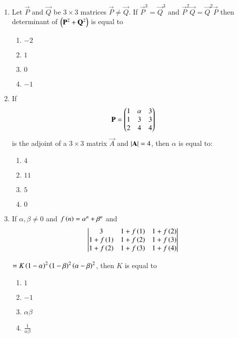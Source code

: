 \documentclass[journal,onecolumn]{IEEEtran}
\theoremstyle{remark}
\begin{document}
\begin{enumerate}
	\item Let $\vec{P}$ and $\vec{Q}$ be $3\times3$ matrices $\vec{P}\neq \vec{Q}$. If $\vec{P}^3=\vec{Q}^3$ and $\vec{P}^2\vec{Q}=\vec{Q}^2\vec{P}$ then determinant of $\left(\mathbf{P}^2+\mathbf{Q}^2\right)$ is equal to
	\hfill{}
        \begin{enumerate}
                \item $-2$
                \item $1$
                \item $0$
                \item $-1$
        \end{enumerate}

	\item If \begin{align*}
		\mathbf{P} = \begin{pmatrix}1&\alpha&3\\
		1&3&3\\
		2&4&4\end{pmatrix}
	\end{align*} is the adjoint of a $3\times3$ matrix $\vec{A}$ and $\left\vert\mathbf{A}\right\vert = 4$, then $\alpha$ is equal to:
	\hfill{}
        \begin{enumerate}
                \item $4$
                \item $11$
                \item $5$
                \item $0$
        \end{enumerate}

	\item If $\alpha,\beta\neq 0$ and $f\left(n\right) = \alpha^n + \beta^n$ and
		\newline
		\begin{align*}
			\begin{vmatrix}
				3 & 1+f\left(1\right) & 1+f\left(2\right)\\
				1+f\left(1\right) & 1+f\left(2\right) & 1+f\left(3\right)\\
				1+f\left(2\right) & 1+f\left(3\right) & 1+f\left(4\right)
			\end{vmatrix}
		\end{align*}

		$=K\left(1-\alpha\right)^2\left(1-\beta\right)^2\left(\alpha-\beta\right)^2$,
		then $K$ is equal to

	\hfill{}
        \begin{enumerate}
                \item $1$
                \item $-1$
                \item $\alpha\beta$
		\item $\frac{1}{\alpha\beta}$
        \end{enumerate}



\end{enumerate}
\end{document}
